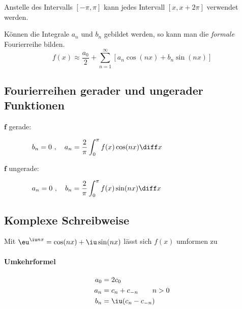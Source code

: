 		\begin{bemerkung}
			Anstelle des Intervalls $[-\pi,\pi]$ kann jedes Intervall $[x,x+2\pi]$
			verwendet werden.
		\end{bemerkung}
		
		Können die Integrale $a_n$ und $b_n$ gebildet werden, so kann man die \emph{formale} Fourierreihe bilden.
		\[
			f(x) \approx \frac{a_0}{2} + \sum_{n=1}^\infty \left[a_n \cos(nx) + b_n \sin(nx)\right]
		\]
	\subsection{Fourierreihen gerader und ungerader Funktionen} %
		\begin{description}
			\item[\phantom{un}$\boldsymbol f$ gerade:] $\displaystyle\quad
				b_n = 0\ ,\quad a_n = \frac{2}{\pi}\int_0^\pi f(x) \cos(nx) \diff x
			$
			\item[$\boldsymbol f$ ungerade:] $\displaystyle\quad
				a_n = 0\ ,\quad b_n = \frac{2}{\pi}\int_0^\pi f(x) \sin(nx) \diff x
			$
		\end{description}
	\subsection{Komplexe Schreibweise} %
		Mit $
			\eu^{\iu nx} = \cos(nx) + \iu \sin(nx)
		$
		lässt sich $f(x)$ umformen zu
		
		\paragraph{Umkehrformel} %
			\begin{align*}
				a_0 &= 2 c_0 \\
				a_n &= c_n + c_{-n} \qquad n>0\\
				b_n &= \iu (c_n - c_{-n})
			\end{align*}
